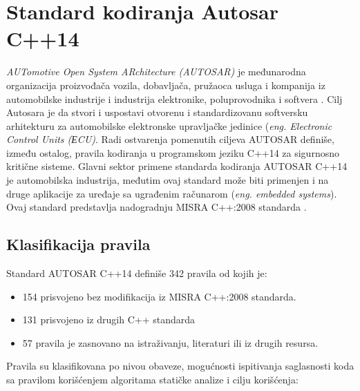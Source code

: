 \documentclass[12pt,oneside]{memoir}
\begin{document}
\chapter{Standard kodiranja Autosar C++14}
\label{chp:autosar}


\textit{AUTomotive Open System ARchitecture (AUTOSAR)} je međunarodna organizacija proizvođača vozila, dobavljača, pružaoca usluga i kompanija iz automobilske industrije i industrija elektronike, poluprovodnika i softvera \cite{AutosarWebsite}. 
Cilj Autosara je da stvori i uspostavi otvorenu i standardizovanu softversku arhitekturu za automobilske elektronske upravljačke jedinice (\textit{eng. Electronic Control Units (ЕCU)}.
Radi ostvarenja pomenutih ciljeva AUTOSAR definiše, između ostalog, pravila kodiranja u programskom jeziku C++14 za sigurnosno kriti\v{c}ne sisteme. Glavni sektor primene standarda kodiranja AUTOSAR C++14 je automobilska industrija, međutim ovaj standard može biti primenjen
i na druge aplikacije za uređaje sa ugrađenim računarom (\textit{eng. embedded systems}). Ovaj standard predstavlja nadogradnju MISRA C++:2008 standarda \cite{AutosarGuidelines}.

\section{Klasifikacija pravila}
Standard AUTOSAR C++14 definiše 342 pravila od kojih je:
\begin{itemize}
  \item {154 prisvojeno bez modifikacija iz MISRA C++:2008 standarda.}
  \item {131 prisvojeno iz drugih C++ standarda}
  \item {57 pravila je zasnovano na istraživanju, literaturi ili iz drugih resursa.}
\end{itemize}
Pravila su klasifikovana po nivou obaveze, mogućnosti ispitivanja saglasnosti koda sa pravilom korišćenjem algoritama
statičke analize i cilju korišćenja:
\end{document}
